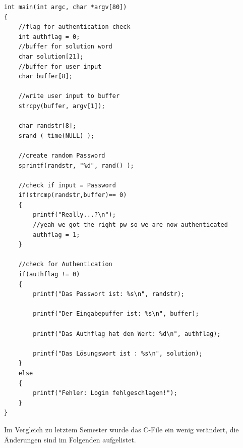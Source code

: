 \begin{lstlisting}
int main(int argc, char *argv[80])
{
    //flag for authentication check
    int authflag = 0;
    //buffer for solution word
    char solution[21];
    //buffer for user input
    char buffer[8];

    //write user input to buffer
    strcpy(buffer, argv[1]);

    char randstr[8];
    srand ( time(NULL) );

    //create random Password
    sprintf(randstr, "%d", rand() );

    //check if input = Password
    if(strcmp(randstr,buffer)== 0)
    {
        printf("Really...?\n");
        //yeah we got the right pw so we are now authenticated
        authflag = 1;
    }

    //check for Authentication
    if(authflag != 0)
    {
        printf("Das Passwort ist: %s\n", randstr);

        printf("Der Eingabepuffer ist: %s\n", buffer);

        printf("Das Authflag hat den Wert: %d\n", authflag);

        printf("Das Lösungswort ist : %s\n", solution);
    }
    else
    {
        printf("Fehler: Login fehlgeschlagen!");
    }
}
\end{lstlisting}
Im Vergleich zu letztem Semester wurde das C-File ein wenig verändert, die Änderungen sind im Folgenden aufgelistet.

